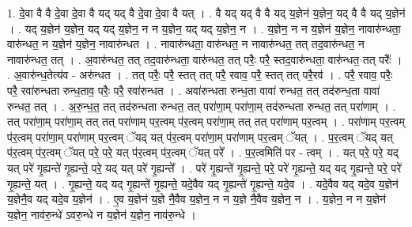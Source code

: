 \documentclass[17pt]{extarticle}
\begin{document}
1. दे॒वा वै वै दे॒वा दे॒वा वै यद् यद् वै दे॒वा दे॒वा वै यत् । . वै यद् यद् वै वै यद् य॒ज्ञेन॑ य॒ज्ञेन॒ यद् वै वै यद् य॒ज्ञेन॑ । . यद् य॒ज्ञेन॑ य॒ज्ञेन॒ यद् यद् य॒ज्ञेन॒ न न य॒ज्ञेन॒ यद् यद् य॒ज्ञेन॒ न । . य॒ज्ञेन॒ न न य॒ज्ञेन॑ य॒ज्ञेन॒ नावारु॑न्धता॒ वारु॑न्धत॒ न य॒ज्ञेन॑ य॒ज्ञेन॒ नावारु॑न्धत । . नावारु॑न्धता॒ वारु॑न्धत॒ न नावारु॑न्धत॒ तत् तद॒वारु॑न्धत॒ न नावारु॑न्धत॒ तत् । . अ॒वारु॑न्धत॒ तत् तद॒वारु॑न्धता॒ वारु॑न्धत॒ तत् परैः॒ परै॒ स्तद॒वारु॑न्धता॒ वारु॑न्धत॒ तत् परैः᳚ । . अ॒वारु॑न्ध॒तेत्य॑व - अरु॑न्धत । . तत् परैः॒ परै॒ स्तत् तत् परै॒ रवाव॒ परै॒ स्तत् तत् परै॒रव॑ । . परै॒ रवाव॒ परैः॒ परै॒ रवा॑रुन्धता रुन्ध॒ताव॒ परैः॒ परै॒ रवा॑रुन्धत । . अवा॑रुन्धता रुन्ध॒ता वावा॑ रुन्धत॒ तत् तद॑रुन्ध॒ता वावा॑ रुन्धत॒ तत् । . अ॒रु॒न्ध॒त॒ तत् तद॑रुन्धता रुन्धत॒ तत् परा॑णा॒म् परा॑णा॒म् तद॑रुन्धता रुन्धत॒ तत् परा॑णाम् । . तत् परा॑णा॒म् परा॑णा॒म् तत् तत् परा॑णाम् पर॒त्वम् प॑र॒त्वम् परा॑णा॒म् तत् तत् परा॑णाम् पर॒त्वम् । . परा॑णाम् पर॒त्वम् प॑र॒त्वम् परा॑णा॒म् परा॑णाम् पर॒त्वम् ॅयद् यत् प॑र॒त्वम् परा॑णा॒म् परा॑णाम् पर॒त्वम् ॅयत् । . प॒र॒त्वम् ॅयद् यत् प॑र॒त्वम् प॑र॒त्वम् ॅयत् परे॒ परे॒ यत् प॑र॒त्वम् प॑र॒त्वम् ॅयत् परे᳚ । . प॒र॒त्वमिति॑ पर - त्वम् । . यत् परे॒ परे॒ यद् यत् परे॑ गृ॒ह्यन्ते॑ गृ॒ह्यन्ते॒ परे॒ यद् यत् परे॑ गृ॒ह्यन्ते᳚ । . परे॑ गृ॒ह्यन्ते॑ गृ॒ह्यन्ते॒ परे॒ परे॑ गृ॒ह्यन्ते॒ यद् यद् गृ॒ह्यन्ते॒ परे॒ परे॑ गृ॒ह्यन्ते॒ यत् । . गृ॒ह्यन्ते॒ यद् यद् गृ॒ह्यन्ते॑ गृ॒ह्यन्ते॒ यदे॒वैव यद् गृ॒ह्यन्ते॑ गृ॒ह्यन्ते॒ यदे॒व । . यदे॒वैव यद् यदे॒व य॒ज्ञेन॑ य॒ज्ञेनै॒व यद् यदे॒व य॒ज्ञेन॑ । . ए॒व य॒ज्ञेन॑ य॒ज्ञे नै॒वैव य॒ज्ञेन॒ न न य॒ज्ञे नै॒वैव य॒ज्ञेन॒ न । . य॒ज्ञेन॒ न न य॒ज्ञेन॑ य॒ज्ञेन॒ नाव॑रु॒न्धे॑ ऽवरु॒न्धे न य॒ज्ञेन॑ य॒ज्ञेन॒ नाव॑रु॒न्धे । \newline
\end{document}
